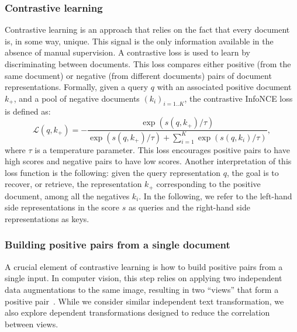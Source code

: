 \documentclass[10pt]{article} %
\begin{document}
\subsubsection{Contrastive learning}

Contrastive learning is an approach that relies on the fact that every document is, in some way, unique.
This signal is the only information available in the absence of manual supervision.
A contrastive loss is used to learn by discriminating between documents.
This loss compares either positive (from the same document) or negative (from different documents) pairs of document representations.
Formally, given a query $q$ with an associated positive document $k_+$, and a pool of negative documents $(k_i)_{i=1..K}$, the contrastive InfoNCE loss is defined as:
\begin{equation}
\mathcal{L}(q, k_+) = - \frac{\exp(s(q, k_+) / \tau)}{\exp(s(q, k_+) / \tau) + \sum_{i=1}^K \exp(s(q, k_i) / \tau)},
\end{equation}
where $\tau$ is a temperature parameter.
This loss encourages positive pairs to have high scores and negative pairs to have low scores.
Another interpretation of this loss function is the following:
given the query representation $q$, the goal is to recover, or retrieve, the representation $k_+$ corresponding to the positive document, among all the negatives $k_i$.
In the following, we refer to the left-hand side representations in the score $s$ as queries and the right-hand side representations as keys.


\subsubsection{Building positive pairs from a single document} 
A crucial element of contrastive learning is how to build positive pairs from a single input.
In computer vision, this step relies on applying two independent data augmentations to the same image, resulting in two ``views'' that form a positive pair~\citep{wu2018unsupervised,chen2020simple}.
While we consider similar independent text transformation, we also explore dependent transformations designed to reduce the correlation between views.
\end{document}
